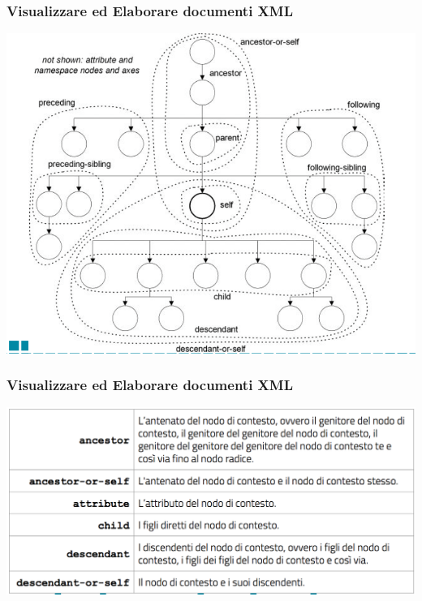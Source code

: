 \begin{frame}
    \frametitle{Visualizzare ed Elaborare documenti XML}
    \addtocounter{nframe}{1}
    
    \begin{center}
        \includegraphics[width=.9\textwidth]{imgs/SchemaAssi-Xpath.png}
    \end{center}

\end{frame}

\begin{frame}
    \frametitle{Visualizzare ed Elaborare documenti XML}
    \addtocounter{nframe}{1}
    
    \begin{center}
        \includegraphics[width=.95\textwidth]{imgs/Schema-Assi-1.png}
    \end{center}

\end{frame}

